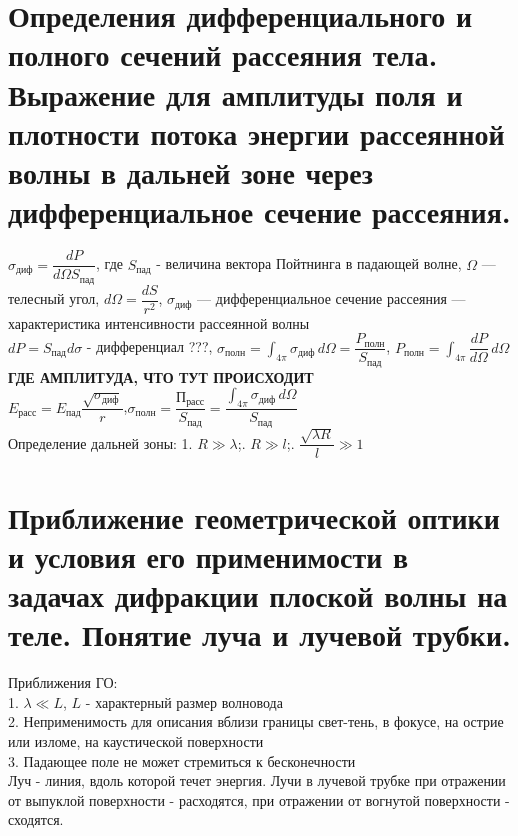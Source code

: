 \begin{multicols*}{2}
		\section{Определения дифференциального и полного сечений рассеяния тела. Выражение для амплитуды поля и плотности потока энергии рассеянной волны в дальней зоне через дифференциальное сечение рассеяния.}

		$\sigma_\text{диф} = \dfrac{dP}{d\Omega S_\text{пад}}$, где $S_\text{пад}$ - величина вектора Пойтнинга в падающей волне, $\Omega$ — телесный угол, $d\Omega = \dfrac{dS}{r^2}$, $\sigma_\text{диф}$ — дифференциальное сечение рассеяния — характеристика интенсивности рассеянной волны\\
		$dP = S_\text{пад}d\sigma$ - дифференциал ???, \quad $\sigma_\text{полн} = \int_{4\pi}\sigma_\text{диф}\,d\Omega = \dfrac{P_\text{полн}}{S_\text{пад}}$, \quad $P_\text{полн} = \int_{4\pi}\dfrac{dP}{d\Omega}\,d\Omega$\\
		\textbf{ГДЕ АМПЛИТУДА, ЧТО ТУТ ПРОИСХОДИТ}\\
		$E_\text{расс} = E_\text{пад}\dfrac{\sqrt{\sigma_\text{диф}}}{r}$,\quad $\sigma_\text{полн} = \dfrac{{\text{П}_\text{расс}}}{S_\text{пад}} = \dfrac{\int_{4\pi}\sigma_\text{диф}\,d\Omega}{S_\text{пад}}$\\
		Определение дальней зоны: 1. $R \gg \lambda$;. $R \gg l$;. $\dfrac{\sqrt{\lambda R}}{l} \gg 1$
		
		\section{Приближение геометрической оптики и условия его применимости в задачах дифракции плоской волны на теле. Понятие луча и лучевой трубки.}
		Приближения ГО: \\
		1. $\lambda \ll L$, $L$ - характерный размер волновода\\
		2. Неприменимость для описания вблизи границы свет-тень, в фокусе, на острие или изломе, на каустической поверхности\\
		3. Падающее поле не может стремиться к бесконечности\\
		Луч - линия, вдоль которой течет энергия. Лучи в лучевой трубке при отражении от выпуклой поверхности - расходятся, при отражении от вогнутой поверхности - сходятся.
		
	\end{multicols*}
